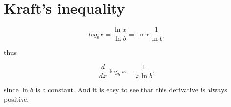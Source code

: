 \section{Kraft's inequality}

\answers{}

\begin{Answer}[ref={deriv-log}]

  \begin{equation*}
    log_b x = \frac{\ln x}{\ln b} = \ln x \frac{1}{\ln b},
  \end{equation*}

  thus

  \begin{equation*}
    \frac{d}{dx} \log_b x = \frac{1}{x\ln b},
  \end{equation*}

  since $\ln b$ is a constant. And it is easy to see that this
  derivative is always positive.
\end{Answer}
